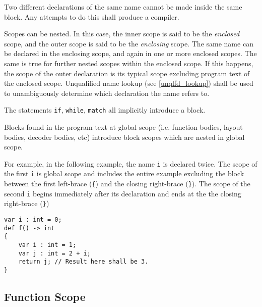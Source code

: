 Two different declarations of the same name cannot be made inside the same block. Any attempts to do this shall produce a compiler. 

Scopes can be nested. In this case, the inner scope is said to be the \textit{enclosed} scope, and the outer scope is said to be the \textit{enclosing} scope. The same name can be declared in the enclosing scope, and again in one or more enclosed scopes. The same is true for further nested scopes within the enclosed scope. If this happens, the scope of the outer declaration is its typical scope excluding program text of the enclosed scope. Unqualified name lookup (see \ref{unqlfd_lookup}) shall be used to unambiguously determine which declaration the name refers to. 

The statements \texttt{if}, \texttt{while}, \texttt{match} all implicitly introduce a block.


Blocks found in the program text at global scope (i.e. function bodies, layout bodies, decoder bodies, etc) introduce block scopes which are nested in global scope.

For example, in the following example, the name \texttt{i} is declared twice. The scope of the first \texttt{i} is global scope and includes the entire example excluding the block between the first left-brace (\texttt{\{}) and the closing right-brace (\texttt{\}}). The scope of the second \texttt{i} begins immediately after its declaration and ends at the the closing right-brace (\texttt{\}})

\noindent\begin{minipage}{\linewidth}
\begin{lstlisting}
var i : int = 0;
def f() -> int
{
	var i : int = 1;
	var j : int = 2 + i;
	return j; // Result here shall be 3.
}
\end{lstlisting}
\end{minipage}

\subsection{Function Scope} \label{function_scope}

